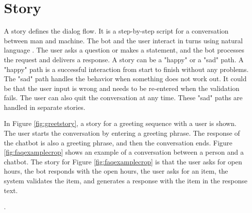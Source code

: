 \section{Story}
A story defines the dialog flow. 
It is a step-by-step script for a conversation between man and machine.
The bot and the user interact in turns using natural language \cite{evaluateChatbotsShawar2007, shawar2007chatbots, huang2007extracting, gregori2017evaluation}.
The user asks a question or makes a statement, and the bot processes the request and delivers a response.
A story can be a "happy" or a "sad" path.
A "happy" path is a successful interaction from start to finish without any problems.
The "sad" path handles the behavior when something does not work out.
It could be that the user input is wrong and needs to be re-entered when the validation fails.
The user can also quit the conversation at any time.
These "sad" paths are handled in separate stories.

In Figure \ref{fig:greetstory}, a story for a greeting sequence with a user is shown. 
The user starts the conversation by entering a greeting phrase. 
The response of the chatbot is also a greeting phrase, and then the conversation ends. 
Figure \ref{fig:faqexamplecrop} shows an example of a conversation between a person and a chatbot.
The story for Figure \ref{fig:faqexamplecrop} is that the user asks for open hours, the bot responds with the open hours, the user asks for an item, the system validates the item, and generates a response with 
the item in the response text.


\cite{braunEvaluatingNLU}.
